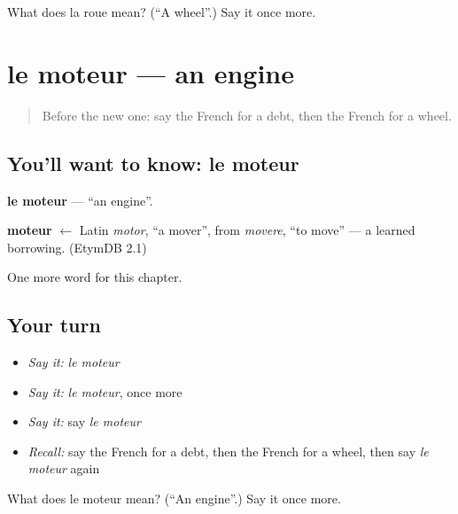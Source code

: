 \begin{tcolorbox}[breakable,colback=teal!4,colframe=teal!35!black,title={Before you move on}]
What does la roue mean? (\textquotedblleft{}A wheel\textquotedblright{}.) Say it once more.
\end{tcolorbox}
\section[le moteur]{le moteur — an engine}

\label{lesson:FR-C227-moteur}



\begin{quote}
Before the new one: say the French for a debt, then the French for a wheel.
\end{quote}

\subsection*{You'll want to know: le moteur}
\textbf{le moteur} — \textquotedblleft{}an engine\textquotedblright{}.

\begin{cousinweb}
\textbf{moteur} $\leftarrow$ Latin \emph{motor}, \textquotedblleft{}a mover\textquotedblright{}, from \emph{movere}, \textquotedblleft{}to move\textquotedblright{} — a learned borrowing. (EtymDB 2.1)
\end{cousinweb}

\begin{grammarlens}[title={What you've built}]
One more word for this chapter.
\end{grammarlens}

\subsection*{Your turn}
\begin{itemize}
\raggedright
  \item \emph{Say it:} \emph{le moteur}
  \item \emph{Say it:} \emph{le moteur}, once more
  \item \emph{Say it:} say \emph{le moteur}
  \item \emph{Recall:} say the French for a debt, then the French for a wheel, then say \emph{le moteur} again
\end{itemize}

\begin{tcolorbox}[breakable,colback=teal!4,colframe=teal!35!black,title={Before you move on}]
What does le moteur mean? (\textquotedblleft{}An engine\textquotedblright{}.) Say it once more.
\end{tcolorbox}
